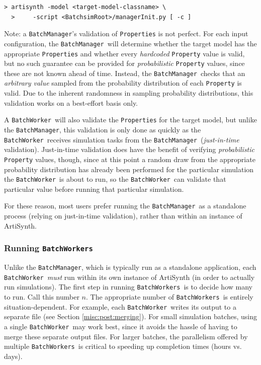 \documentclass{article}
\newcommand{\BM}{{\tt BatchManager}}
\newcommand{\BW}{{\tt BatchWorker}}
\newcommand{\BWs}{{\tt BatchWorkers}}
\begin{document}
\begin{lstlisting}[]
  > artisynth -model <target-model-classname> \
  >     -script <BatchsimRoot>/managerInit.py [ -c ]
\end{lstlisting}

\begin{sideblock}
Note: a \BM's validation of {\tt Properties} is not perfect. For each input configuration, the \BM\ will determine whether the target model has the appropriate {\tt Properties} and whether every \textit{hardcoded} {\tt Property} value is valid, but no such guarantee can be provided for \textit{probabilistic} {\tt Property} values, since these are not known ahead of time. Instead, the \BM\ checks that an \textit{arbitrary value} sampled from the probability distribution of each {\tt Property} is valid. Due to the inherent randomness in sampling probability distributions, this validation works on a best-effort basis only.

A \BW\ will also validate the {\tt Properties} for the target model, but unlike the \BM, this validation is only done as quickly as the \BW\ receives simulation tasks from the \BM\ (\textit{just-in-time} validation). Just-in-time validation does have the benefit of verifying \textit{probabilistic} {\tt Property} values, though, since at this point a random draw from the appropriate probability distribution has already been performed for the particular simulation the \BW\ is about to run, so the \BW\ can validate that particular value before running that particular simulation.

For these reason, most users prefer running the \BM\ as a standalone process (relying on just-in-time validation), rather than within an instance of ArtiSynth.
\end{sideblock}

\subsubsection{Running \BWs}
\label{running:CLI:BW}

Unlike the \BM, which is typically run as a standalone application, each \BW\ \textit{must} run within its own instance of ArtiSynth (in order to actually run simulations). The first step in running \BWs\ is to decide how many to run. Call this number $n$. The appropriate number of \BWs\ is entirely situation-dependent. For example, each \BW\ writes its output to a separate file (see Section \ref{misc:post:merging}). For small simulation batches, using a single \BW\ may work best, since it avoids the hassle of having to merge these separate output files. For larger batches, the parallelism offered by multiple \BWs\ is critical to speeding up completion times (hours vs. days).
\end{document}
